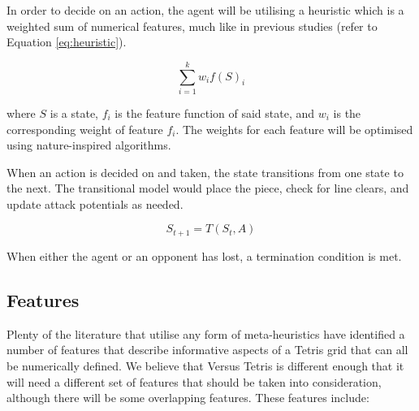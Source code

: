 \documentclass[a4paper, 12pt]{extreport}
\begin{document}
	In order to decide on an action, the agent will be utilising a heuristic which is a weighted sum of numerical features, much like in previous studies (refer to Equation \ref{eq:heuristic}).
	
	\begin{equation}\label{eq:heuristic}
		\sum_{i=1}^{k} w_i f(S)_i
	\end{equation}
	
	\noindent where $S$ is a state, $f_i$ is the feature function of said state, and $w_i$ is the corresponding weight of feature $f_i$. The weights for each feature will be optimised using nature-inspired algorithms.
	
	When an action is decided on and taken, the state transitions from one state to the next. The transitional model would place the piece, check for line clears, and update attack potentials as needed.
	
	\begin{equation}
		S_{t+1} = T(S_t, A)
	\end{equation}
	
	When either the agent or an opponent has lost, a termination condition is met.
	
	\subsection{Features}\label{subsec:features}
	
	Plenty of the literature that utilise any form of meta-heuristics have identified a number of features that describe informative aspects of a Tetris grid that can all be numerically defined. We believe that Versus Tetris is different enough that it will need a different set of features that should be taken into consideration, although there will be some overlapping features. These features include:
	
\end{document}
